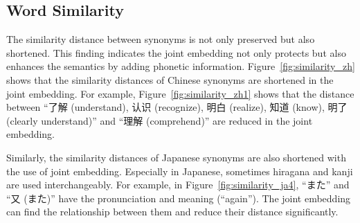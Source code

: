 \subsection{Word Similarity} \label{sec:analysis_similarity}
\begin{CJK}{UTF8}{gbsn}
    The similarity distance between synonyms is not only preserved but also shortened. This finding indicates the joint embedding not only protects but also enhances the semantics by adding phonetic information. Figure~\ref{fig:similarity_zh} shows that the similarity distances of Chinese synonyms are shortened in the joint embedding. For example, Figure~\ref{fig:similarity_zh1} shows that the distance between ``了解 (understand), 认识 (recognize), 明白 (realize), 知道 (know), 明了 (clearly understand)'' and ``理解 (comprehend)'' are reduced in the joint embedding.
\end{CJK}

\begin{CJK}{UTF8}{ipxm}
    Similarly, the similarity distances of Japanese synonyms are also shortened with the use of joint embedding. Especially in Japanese, sometimes hiragana and kanji are used interchangeably. For example, in Figure~\ref{fig:similarity_ja4}, ``また'' and ``又 (また)'' have the pronunciation and meaning (``again''). The joint embedding can find the relationship between them and reduce their distance significantly.
\end{CJK}

